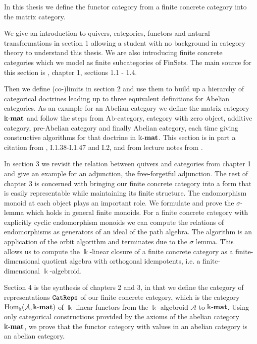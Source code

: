 In this thesis we define the functor category from a finite concrete category into the matrix category.

We give an introduction to quivers, categories, functors and natural transformations in section 1 allowing a student with
no background in category theory to understand this thesis. We are also introducing finite concrete categories which we
model as finite subcategories of $\mathrm{FinSets}$. The main source for this section is \cite{[context]}, chapter 1, sections 1.1 - 1.4.

Then we define (co-)limits in section 2 and use them to build up a hierarchy of categorical doctrines leading up
to three equivalent definitions for Abelian categories.
As an example for an Abelian category we define the matrix category $\Bbbk\textnormal{-}\mathbf{mat}$
and follow the steps from Ab-category, category with zero object, additive category, pre-Abelian category and
finally Abelian category, each time giving constructive algorithms for that doctrine in $\Bbbk\textnormal{-}\mathbf{mat}$. This section is in part a 
citation from \cite{[Posur]}, I.1.38-I.1.47 and I.2, and from lecture notes from \cite{[AlgAlg]}.

In section 3 we revisit the relation between quivers and categories from chapter 1
and give an example for an adjunction, the free-forgetful adjunction. The rest of chapter 3 is concerned with
bringing our finite concrete category into a form that is easily representable while maintaining its finite structure.
The endomorphism monoid at each object plays an important role. We formulate and prove the $\sigma$-lemma
which holds in general finite monoids. For a finite concrete category with explicitly
cyclic endomorphism monoids we can compute the relations of endomorphisms as generators of an ideal
of the path algebra. The algorithm is an application of the orbit algorithm and terminates due to the $\sigma$ lemma.
This allows us to compute the $\Bbbk$-linear closure of a finite concrete category
as a finite-dimensional quotient algebra with orthogonal idempotents, i.e. a finite-dimensional $\Bbbk$-algebroid.

Section 4 is the synthesis of chapters 2 and 3, in that we define the category of representations $\texttt{CatReps}$
of our finite concrete category, which is the category $\mathrm{Hom_{\Bbbk}}(\mathcal{A},\Bbbk\textnormal{-}\mathbf{mat})$ of $\Bbbk$-linear functors from the $\Bbbk$-algebroid
$\mathcal{A}$ to $\Bbbk\textnormal{-}\mathbf{mat}$. Using only categorical constructions provided by the axioms of the abelian category $\Bbbk\textnormal{-}\mathbf{mat}$, we prove that
the functor category with values in an abelian category is an abelian category.

